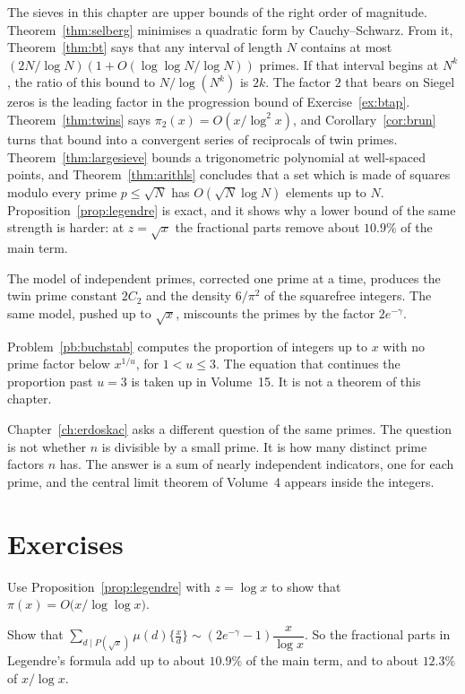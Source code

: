 The sieves in this chapter are upper bounds of the right order of magnitude. Theorem~\ref{thm:selberg} minimises a quadratic form by Cauchy--Schwarz. From it, Theorem~\ref{thm:bt} says that any interval of length $N$ contains at most $(2N/\log N)(1+O(\log\log N/\log N))$ primes. If that interval begins at $N^k$, the ratio of this bound to $N/\log(N^k)$ is $2k$. The factor $2$ that bears on Siegel zeros is the leading factor in the progression bound of Exercise~\ref{ex:btap}. Theorem~\ref{thm:twins} says $\pi_2(x)=O(x/\log^2x)$, and Corollary~\ref{cor:brun} turns that bound into a convergent series of reciprocals of twin primes. Theorem~\ref{thm:largesieve} bounds a trigonometric polynomial at well-spaced points, and Theorem~\ref{thm:arithls} concludes that a set which is made of squares modulo every prime $p\le\sqrt N$ has $O(\sqrt N\log N)$ elements up to $N$. Proposition~\ref{prop:legendre} is exact, and it shows why a lower bound of the same strength is harder: at $z=\sqrt x$ the fractional parts remove about $10.9\%$ of the main term.

The model of independent primes, corrected one prime at a time, produces the twin prime constant $2C_2$ and the density $6/\pi^2$ of the squarefree integers. The same model, pushed up to $\sqrt x$, miscounts the primes by the factor $2e^{-\gamma}$.

Problem~\ref{pb:buchstab} computes the proportion of integers up to $x$ with no prime factor below $x^{1/u}$, for $1<u\le3$. The equation that continues the proportion past $u=3$ is taken up in Volume~15. It is not a theorem of this chapter.

Chapter~\ref{ch:erdoskac} asks a different question of the same primes. The question is not whether $n$ is divisible by a small prime. It is how many distinct prime factors $n$ has. The answer is a sum of nearly independent indicators, one for each prime, and the central limit theorem of Volume~4 appears inside the integers.

\section{Exercises}

\begin{exercise}[$\star$]\label{ex:legendrepi}
Use Proposition~\ref{prop:legendre} with $z=\log x$ to show that $\pi(x)=O\bigl(x/\log\log x\bigr)$.
\end{exercise}

\begin{exercise}[$\star$]\label{ex:legendrefail}
Show that $\displaystyle\sum_{d\mid P(\sqrt x)}\mu(d)\bigl\{\tfrac xd\bigr\}\sim(2e^{-\gamma}-1)\dfrac x{\log x}$. So the fractional parts in Legendre's formula add up to about $10.9\%$ of the main term, and to about $12.3\%$ of $x/\log x$.
\end{exercise}

